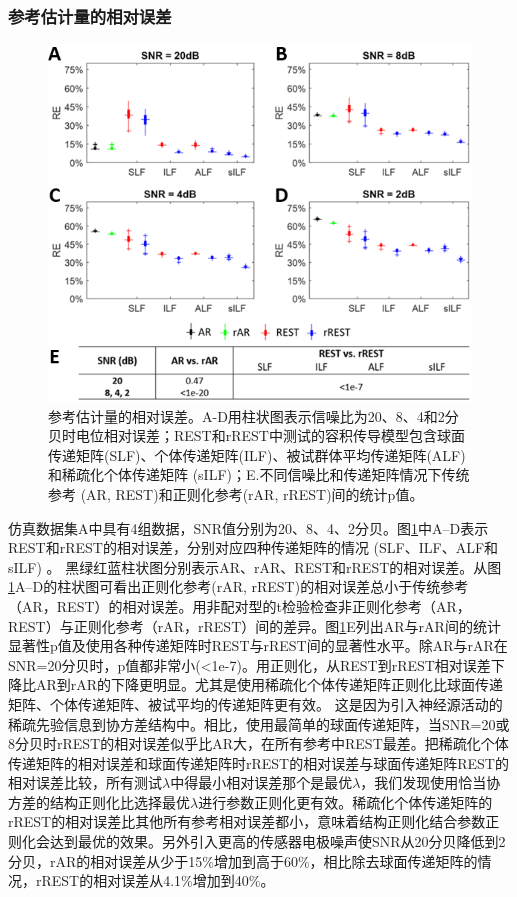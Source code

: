 \subsubsection{参考估计量的相对误差}
\begin{figure}[!h]
	\includegraphics[width=15cm]{pic/Frontier/figure4.png}
	\caption{参考估计量的相对误差。A-D用柱状图表示信噪比为20、8、4和2分贝时电位相对误差；REST和rREST中测试的容积传导模型包含球面
	传递矩阵(SLF)、个体传递矩阵(ILF)、被试群体平均传递矩阵(ALF)和稀疏化个体传递矩阵 (sILF)；E.不同信噪比和传递矩阵情况下传统参考
	(AR, REST)和正则化参考(rAR, rREST)间的统计p值。}
	\label{3:4}
\end{figure}
仿真数据集A中具有4组数据，SNR值分别为20、8、4、2分贝。图\ref{3:4}中A–D表示REST和rREST的相对误差，分别对应四种传递矩阵的情况 (SLF、ILF、ALF和sILF) 。 黑绿红蓝柱状图分别表示AR、rAR、REST和rREST的相对误差。从图\ref{3:4}A–D的柱状图可看出正则化参考(rAR, rREST)的相对误差总小于传统参考（AR，REST）的相对误差。用非配对型的t检验检查非正则化参考（AR，REST）与正则化参考（rAR，rREST）间的差异。图\ref{3:4}E列出AR与rAR间的统计显著性p值及使用各种传递矩阵时REST与rREST间的显著性水平。除AR与rAR在SNR=20分贝时，p值都非常小(<1e-7)。用正则化，从REST到rREST相对误差下降比AR到rAR的下降更明显。尤其是使用稀疏化个体传递矩阵正则化比球面传递矩阵、个体传递矩阵、被试平均的传递矩阵更有效。 这是因为引入神经源活动的稀疏先验信息到协方差结构中。相比，使用最简单的球面传递矩阵，当SNR=20或8分贝时rREST的相对误差似乎比AR大，在所有参考中REST最差。把稀疏化个体传递矩阵的相对误差和球面传递矩阵时rREST的相对误差与球面传递矩阵REST的相对误差比较，所有测试$\lambda$中得最小相对误差那个是最优$\lambda$，我们发现使用恰当协方差的结构正则化比选择最优$\lambda$进行参数正则化更有效。稀疏化个体传递矩阵的rREST的相对误差比其他所有参考相对误差都小，意味着结构正则化结合参数正则化会达到最优的效果。另外引入更高的传感器电极噪声使SNR从20分贝降低到2分贝，rAR的相对误差从少于15\%增加到高于60\%，相比除去球面传递矩阵的情况，rREST的相对误差从4.1\%增加到40\%。
